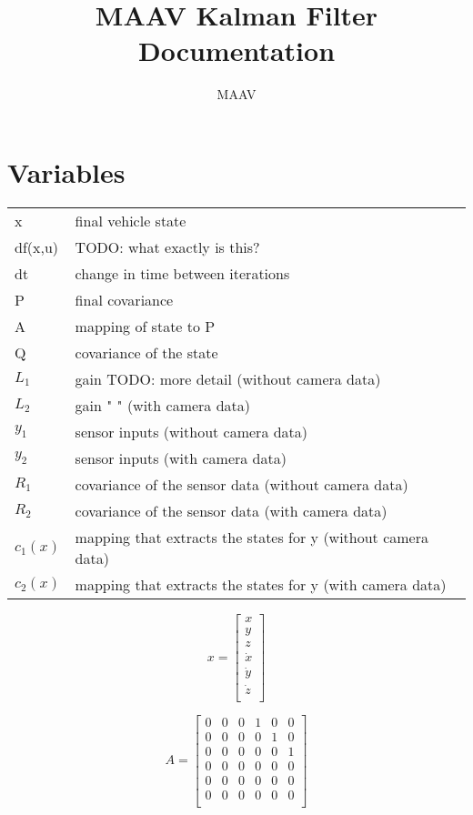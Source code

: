 \documentclass{article}
\begin{document}
\title{MAAV Kalman Filter Documentation}
\author{MAAV}
\date{}
\maketitle

\section{Variables}

\begin{table}[h]
    \begin{tabular}{ll}
	    x & final vehicle state\\
	    df(x,u) & TODO: what exactly is this?\\
	    dt & change in time between iterations\\
	    P & final covariance\\
	    A & mapping of state to P\\
	    Q & covariance of the state\\
	    $L_1$ & gain TODO: more detail (without camera data)\\
	    $L_2$ & gain "               " (with camera data)\\
	    $y_1$ & sensor inputs (without camera data)\\
	    $y_2$ & sensor inputs (with camera data)\\
	    $R_1$ & covariance of the sensor data (without camera data)\\
	    $R_2$ & covariance of the sensor data (with camera data)\\
	    $c_1(x)$ & mapping that extracts the states for y (without camera data)\\
	    $c_2(x)$ & mapping that extracts the states for y (with camera data)\\
	\end{tabular}
\end{table}

\[
	x=
	\left[ {\begin{array}{cccccc}
				x\\
				y\\
				z\\
				\dot x\\
				\dot y\\
				\dot z\\
	\end{array} } \right]
\]

\[
	A= 
	\left[ {\begin{array}{cccccc}
				0 & 0 & 0 & 1 & 0 & 0\\
				0 & 0 & 0 & 0 & 1 & 0\\
				0 & 0 & 0 & 0 & 0 & 1\\
				0 & 0 & 0 & 0 & 0 & 0\\
				0 & 0 & 0 & 0 & 0 & 0\\
				0 & 0 & 0 & 0 & 0 & 0\\
	\end{array} } \right]
\]
\end{document}
